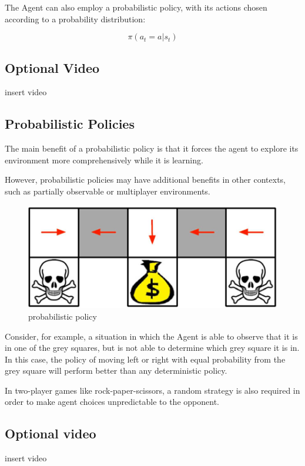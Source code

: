 \documentclass[11pt]{article}
\begin{document}
The Agent can also employ a probabilistic policy, with its actions chosen
according to a probability distribution:

\[\pi (a_t = a | s_t)\]

\subsection{Optional Video}\label{subsec:optional-video}
insert video

\subsection{Probabilistic Policies}\label{subsec:probabilistic-policies}
The main benefit of a probabilistic policy is that it forces the agent to
explore its environment more comprehensively while it is learning.

However, probabilistic policies may have additional benefits in other contexts,
such as partially observable or multiplayer environments.

\begin{figure}[h]
    \centering
    \includegraphics[width=\textwidth]{../out/images/probabilistic-policy}
    \caption[probabilistic policy]{probabilistic policy}
    \label{fig:probabilistic policy}
\end{figure}

Consider, for example, a situation in which the Agent is able to observe that
it is in one of the grey squares, but is not able to determine which grey
square it is in.
In this case, the policy of moving left or right with equal probability from
the grey square will perform better than any deterministic policy.

In two-player games like rock-paper-scissors, a random strategy is also
required in order to make agent choices unpredictable to the opponent.

\subsection{Optional video}\label{subsec:optional-video2}
insert video
\end{document}
